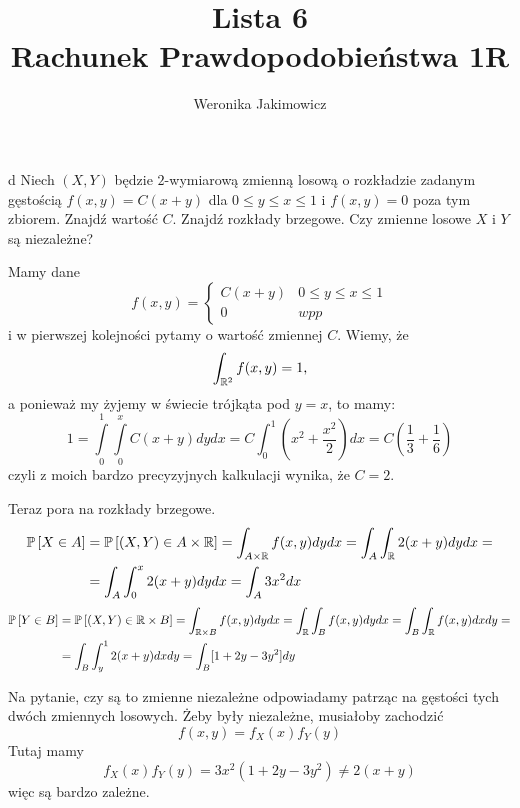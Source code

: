 \documentclass{article}
\title{Lista 6\\{\normalsize Rachunek Prawdopodobieństwa 1R}}
\author{Weronika Jakimowicz}
\date{}
\begin{document}
\maketitle
\thispagestyle{empty}

\begin{problem}[1]{d}
Niech $(X,Y)$ będzie $2$-wymiarową zmienną losową o rozkładzie zadanym gęstością $f(x,y)=C(x+y)$ dla $0\leq y\leq x\leq 1$ i $f(x,y)=0$ poza tym zbiorem. Znajdź wartość $C$. Znajdź rozkłady brzegowe. Czy zmienne losowe $X$ i $Y$ są niezależne?
\end{problem}

\begin{wrapfigure}{r}{0.25\textwidth}
\end{wrapfigure}
Mamy dane
$$f(x,y)=\begin{cases}C(x+y)&0\leq y\leq x\leq1\\0&wpp\end{cases}$$
i w pierwszej kolejności pytamy o wartość zmiennej $C$. Wiemy, że 
$$\int_{\mathbb{R}^2}f(x,y)=1,$$ 
a ponieważ my żyjemy w świecie trójkąta pod $y=x$, to mamy:
$$1=\int\limits_0^1\int\limits_0^xC(x+y)dydx=C\int_0^1(x^2+\frac{x^2}{2})dx=C(\frac{1}{3}+\frac{1}{6})$$
czyli z moich bardzo precyzyjnych kalkulacji wynika, że $C=2$.

Teraz pora na rozkłady brzegowe. 
\begin{align*}
    \prob{X\in A}&=\prob{(X,Y)\in A\times\R}=\int_{A\times\R}f(x,y)dydx=\int_A\int_\R2(x+y)dydx=\\
    &=\int_A\int_0^x2(x+y)dydx=\int_A{3x^2}dx
\end{align*}
\begin{align*}
    \prob{Y\in B}&=\prob{(X,Y)\in\R\times B}=\int_{\R\times B}f(x,y)dydx=\int_\R\int_Bf(x,y)dydx=\int_B\int_\R f(x,y)dxdy=\\
    &=\int_B\int_y^12(x+y)dxdy=\int_B[1+2y-3y^2]dy
\end{align*}

Na pytanie, czy są to zmienne niezależne odpowiadamy patrząc na gęstości tych dwóch zmiennych losowych. Żeby były niezależne, musiałoby zachodzić
$$f(x,y)=f_X(x)f_Y(y)$$
Tutaj mamy
$$f_X(x)f_Y(y)=3x^2(1+2y-3y^2)\neq2(x+y)$$
więc są bardzo zależne.
\end{document}

